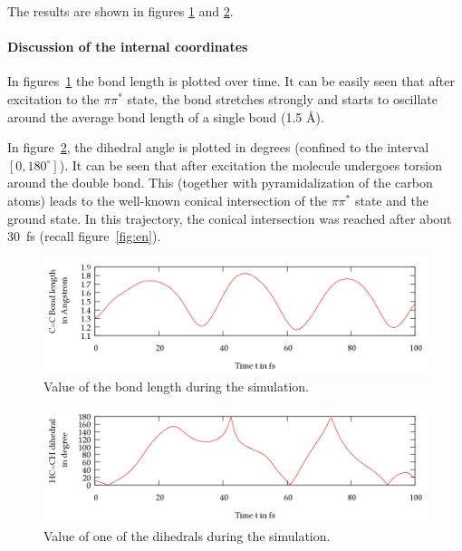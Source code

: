 \documentclass[a4paper,11pt,DIV=15,openany]{scrbook}
\begin{document}
\normalsize
The results are shown in figures \ref{fig:cc} and \ref{fig:dih}.

\paragraph{Discussion of the internal coordinates} 

In figures~\ref{fig:cc} the  bond length is plotted over time. It can be easily seen that after excitation to the $\pi\pi^*$ state, the  bond stretches strongly and starts to oscillate around the average bond length of a single  bond (1.5 \AA). 

In figure~\ref{fig:dih}, the dihedral angle  is plotted in degrees (confined to the interval $[0,180^\circ]$). It can be seen that after excitation the molecule undergoes torsion around the double bond. This (together with pyramidalization of the carbon atoms) leads to the well-known conical intersection of the $\pi\pi^*$ state and the ground state. In this trajectory, the conical intersection was reached after about 30~fs (recall figure~\ref{fig:en}).

\begin{figure}[h]
  \centering
  \includegraphics[width=\textwidth]{figures/CC.png}
  \caption{Value of the  bond length during the simulation.}
  \label{fig:cc}
\end{figure}
\begin{figure}[h]
  \centering
  \includegraphics[width=\textwidth]{figures/dih.png}
  \caption{Value of one of the  dihedrals during the simulation.}
  \label{fig:dih}
\end{figure}
\end{document}
